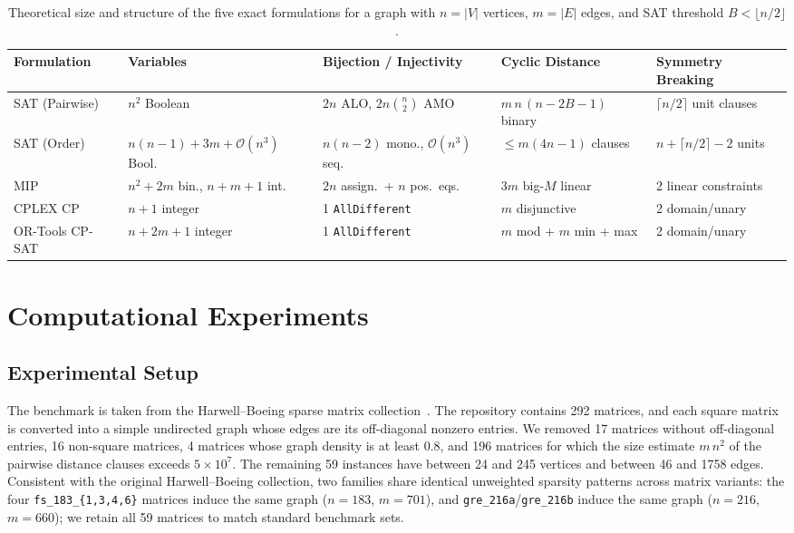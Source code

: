 \documentclass[a4paper,fleqn]{cas-sc}
\begin{document}
\begin{table}[pos=htbp]
\centering
\caption{Theoretical size and structure of the five exact formulations for a graph with $n=|V|$ vertices, $m=|E|$ edges, and SAT threshold $B<\lfloor n/2\rfloor$.}
\label{tab:formulation_complexity}
\scriptsize
\setlength{\tabcolsep}{3.5pt}
\begin{tabular*}{\textwidth}{@{\extracolsep{\fill}}lllll@{}}
\toprule
\textbf{Formulation} & \textbf{Variables} & \textbf{Bijection / Injectivity} & \textbf{Cyclic Distance} & \textbf{Symmetry Breaking} \\
\midrule
SAT (Pairwise) & $n^2$ Boolean & $2n$ ALO, $2n\binom{n}{2}$ AMO & $m\,n\,(n-2B-1)$ binary & $\lceil n/2\rceil$ unit clauses \\
SAT (Order) & $n(n-1)+3m+\mathcal{O}(n^3)$ Bool. & $n(n-2)$ mono., $\mathcal{O}(n^3)$ seq. & $\le m(4n-1)$ clauses & $n+\lceil n/2\rceil-2$ units \\
MIP & $n^2+2m$ bin., $n+m+1$ int. & $2n$ assign.\ + $n$ pos.\ eqs. & $3m$ big-$M$ linear & 2 linear constraints \\
CPLEX CP & $n+1$ integer & 1 \texttt{AllDifferent} & $m$ disjunctive & 2 domain/unary \\
OR-Tools CP-SAT & $n+2m+1$ integer & 1 \texttt{AllDifferent} & $m$ mod + $m$ min + max & 2 domain/unary \\
\bottomrule
\end{tabular*}
\end{table}

\section{Computational Experiments}
\label{sec:experiments}

\subsection{Experimental Setup}

The benchmark is taken from the Harwell--Boeing sparse matrix collection~\citep{duff1989}. The repository contains 292 matrices, and each square matrix is converted into a simple undirected graph whose edges are its off-diagonal nonzero entries. We removed 17 matrices without off-diagonal entries, 16 non-square matrices, 4 matrices whose graph density is at least 0.8, and 196 matrices for which the size estimate $m\,n^2$ of the pairwise distance clauses exceeds $5\times10^{7}$. The remaining 59 instances have between 24 and 245 vertices and between 46 and 1758 edges. Consistent with the original Harwell--Boeing collection, two families share identical unweighted sparsity patterns across matrix variants: the four \texttt{fs\_183\_\{1,3,4,6\}} matrices induce the same graph ($n=183$, $m=701$), and \texttt{gre\_216a}/\texttt{gre\_216b} induce the same graph ($n=216$, $m=660$); we retain all 59 matrices to match standard benchmark sets.
\end{document}
